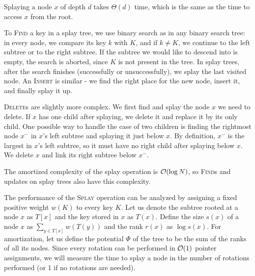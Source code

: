 Splaying a node $x$ of depth $d$ takes $\Theta(d)$ time, which is the same
as the time to access $x$ from the root.

To \textsc{Find} a key in a splay tree, we use binary search as in any
binary search tree: in every node, we compare its key $k$ with $K$, and
if $k \neq K$, we continue to the left subtree or to the right subtree.
If the subtree we would like to descend into is empty, the search is aborted,
since $K$ is not present in the tree.
In splay trees, after the search finishes (successfully or unsuccessfully),
we splay the last visited node.
An \textsc{Insert} is similar - we find the right place for the new node,
insert it, and finally splay it up.

\textsc{Delete}s are slightly more complex. We first find and splay the node $x$
we need to delete. If $x$ has one child after splaying, we delete it and replace
it by its only child. One possible way to handle the case of two children is
finding the rightmost node $x^-$ in $x$'s left subtree and splaying it just
below $x$. By definition, $x^-$ is the largest in $x$'s left subtree, so it
must have no right child after splaying below $x$. We delete $x$ and link
its right subtree below $x^-$.

The amortized complexity of the splay operation is $\mathcal{O}(\log N)$,
so \textsc{Find}s and updates on splay trees also have this complexity.

The performance of the \textsc{Splay} operation can be analyzed by assigning
a fixed positive weight $w(K)$ to every key $K$. Let us denote the subtree
rooted at a node $x$ as $T[x]$ and the key stored in $x$ as $T(x)$.
Define the size $s(x)$ of a node $x$ as $\sum_{y\in T[x]} w(T(y))$
and the rank $r(x)$ as $\log s(x)$.
For amortization, let us define the potential $\Phi$ of the tree to be the sum
of the ranks of all its nodes. Since every rotation can be performed in $\mathcal{O}(1)$
pointer assignments, we will measure the time to splay a node in the number
of rotations performed (or 1 if no rotations are needed).


